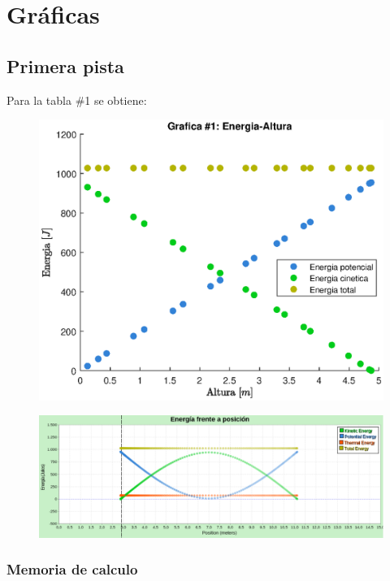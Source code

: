 \documentclass[letter,11pt]{article}
\begin{document}
\section{Gráficas}

\subsection{Primera pista}
Para la tabla \#1 se obtiene:

\begin{figure}[!h]
\centering
\includegraphics[scale=1.00]{resources/8.1.1.eps}
\end{figure}

\begin{figure}[!h]
\centering
\includegraphics[scale=0.475]{resources/grafica1.eps}
\end{figure}

\subsubsection{Memoria de calculo}
\end{document}
